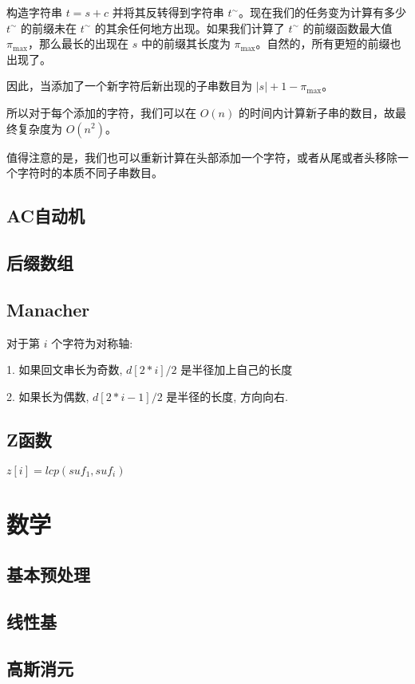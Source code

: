 \documentclass[a4paper]{article}
\begin{document}
构造字符串 $t = s + c$ 并将其反转得到字符串 $t^{\sim}$。现在我们的任务变为计算有多少 $t^{\sim}$ 的前缀未在 $t^{\sim}$ 的其余任何地方出现。如果我们计算了 $t^{\sim}$ 的前缀函数最大值 $\pi_{\max}$，那么最长的出现在 $s$ 中的前缀其长度为 $\pi_{\max}$。自然的，所有更短的前缀也出现了。

因此，当添加了一个新字符后新出现的子串数目为 $|s| + 1 - \pi_{\max}$。

所以对于每个添加的字符，我们可以在 $O(n)$ 的时间内计算新子串的数目，故最终复杂度为 $O(n^2)$。

值得注意的是，我们也可以重新计算在头部添加一个字符，或者从尾或者头移除一个字符时的本质不同子串数目。

\subsection{AC自动机}


\subsection{后缀数组}


\subsection{Manacher}
对于第 $i$ 个字符为对称轴: 

1. 如果回文串长为奇数, $d[2 * i]/2$ 是半径加上自己的长度

2. 如果长为偶数, $d[2 * i -1]/2$ 是半径的长度, 方向向右. 


\subsection{Z函数}
$z[i]=lcp(suf_1, suf_i)$

\section{数学}
\subsection{基本预处理}

\subsection{线性基}

\subsection{高斯消元}
\end{document}
